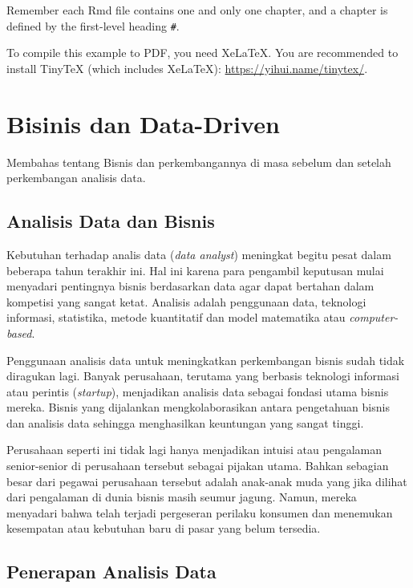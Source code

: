 \documentclass[]{book}
\begin{document}
Remember each Rmd file contains one and only one chapter, and a chapter is defined by the first-level heading \texttt{\#}.

To compile this example to PDF, you need XeLaTeX. You are recommended to install TinyTeX (which includes XeLaTeX): \url{https://yihui.name/tinytex/}.

\hypertarget{business}{%
\chapter{Bisinis dan Data-Driven}\label{business}}

Membahas tentang Bisnis dan perkembangannya di masa sebelum dan setelah perkembangan analisis data.

\hypertarget{analisis-data-dan-bisnis}{%
\section{Analisis Data dan Bisnis}\label{analisis-data-dan-bisnis}}

Kebutuhan terhadap analis data (\emph{data analyst}) meningkat begitu pesat dalam beberapa tahun terakhir ini. Hal ini karena para pengambil keputusan mulai menyadari pentingnya bisnis berdasarkan data agar dapat bertahan dalam kompetisi yang sangat ketat. Analisis adalah penggunaan data, teknologi informasi, statistika, metode kuantitatif dan model matematika atau \emph{computer-based}.

Penggunaan analisis data untuk meningkatkan perkembangan bisnis sudah tidak diragukan lagi. Banyak perusahaan, terutama yang berbasis teknologi informasi atau perintis (\emph{startup}), menjadikan analisis data sebagai fondasi utama bisnis mereka. Bisnis yang dijalankan mengkolaborasikan antara pengetahuan bisnis dan analisis data sehingga menghasilkan keuntungan yang sangat tinggi.

Perusahaan seperti ini tidak lagi hanya menjadikan intuisi atau pengalaman senior-senior di perusahaan tersebut sebagai pijakan utama. Bahkan sebagian besar dari pegawai perusahaan tersebut adalah anak-anak muda yang jika dilihat dari pengalaman di dunia bisnis masih seumur jagung. Namun, mereka menyadari bahwa telah terjadi pergeseran perilaku konsumen dan menemukan kesempatan atau kebutuhan baru di pasar yang belum tersedia.

\hypertarget{penerapan-analisis-data}{%
\section{Penerapan Analisis Data}\label{penerapan-analisis-data}}
\end{document}
